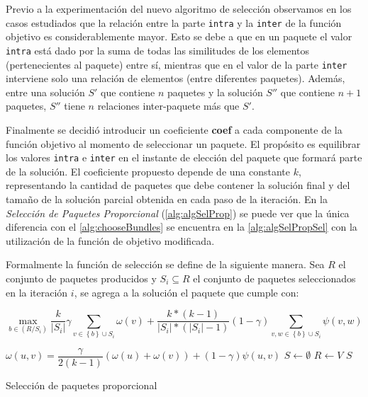 Previo a la experimentación del nuevo algoritmo de selección observamos en los casos estudiados que la relación entre la parte \texttt{intra} y la \texttt{inter} de la función objetivo es considerablemente mayor. Esto se debe a que en un paquete el valor \texttt{intra} está dado por la suma de todas las similitudes de los elementos (pertenecientes al paquete) entre sí, mientras que en el valor de la parte \texttt{inter} interviene solo una relación de elementos (entre diferentes paquetes). Además, entre una solución $S'$ que contiene $n$ paquetes y la solución $S''$ que contiene $n+1$ paquetes, $S''$ tiene $n$ relaciones inter-paquete más que $S'$.

Finalmente se decidió introducir un coeficiente \textbf{coef} a cada componente de la función objetivo al momento de seleccionar un paquete. El propósito es equilibrar los valores \texttt{intra} e \texttt{inter} en el instante de elección del paquete que formará parte de la solución. El coeficiente propuesto depende de una constante $k$, representando la cantidad de paquetes que debe contener la solución final y del tamaño de la solución parcial obtenida en cada paso de la iteración. En la \textit{Selección de Paquetes Proporcional} (\autoref{alg:algSelProp}) se puede ver que la única diferencia con el \autoref{alg:chooseBundles} se encuentra en la \autoref{alg:algSelPropSel} con la utilización de la función de objetivo modificada. 

Formalmente la función de selección se define de la siguiente manera. Sea $R$ el conjunto de paquetes producidos y $S_i \subseteq R$ el conjunto de paquetes seleccionados en la iteración $i$, se agrega a la solución el paquete que cumple con:

\begin{equation}
\max_{b \in (R/S_i)}{\dfrac{k}{|S_i|}} \gamma \sum_{v \in \left\{b\right\} \cup S_i}{\omega(v)} + \dfrac{k * (k-1)}{|S_i| * (|S_i|-1)} (1-\gamma) \sum_{v,w \in \left\{b\right\} \cup S_i}{\psi(v,w)}
\end{equation}

\begin{center}
	\begin{algorithm}[H]
	\DontPrintSemicolon
	\SetAlgoLined
		$\omega(u,v) = \dfrac{\gamma}{2( k - 1)} (\omega(u) + \omega(v)) + (1 - \gamma)\psi(u,v)$\;
		$S \leftarrow \emptyset$\;
		$R \leftarrow V$\;
		\Return $S$\;
	\caption{Selección de paquetes proporcional}\label{alg:algSelProp}
	\end{algorithm}
\end{center}

